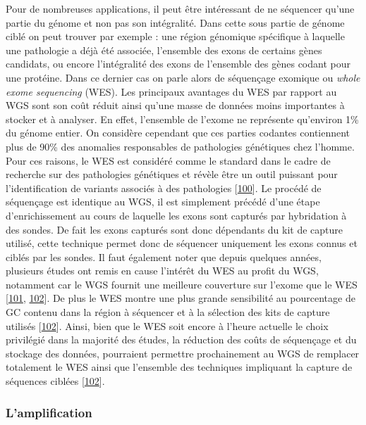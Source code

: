 \documentclass[12pt,twoside]{reedthesis}
\theoremstyle{definition}
\theoremstyle{definition}
\theoremstyle{remark}
\begin{document}
  Pour de nombreuses applications, il peut être intéressant de ne
  séquencer qu'une partie du génome et non pas son intégralité. Dans cette
  sous partie de génome ciblé on peut trouver par exemple : une région
  génomique spécifique à laquelle une pathologie a déjà été associée,
  l'ensemble des exons de certains gènes candidats, ou encore
  l'intégralité des exons de l'ensemble des gènes codant pour une
  protéine. Dans ce dernier cas on parle alors de séquençage exomique ou
  \emph{whole exome sequencing} (WES). Les principaux avantages du WES par
  rapport au WGS sont son coût réduit ainsi qu'une masse de données moins
  importantes à stocker et à analyser. En effet, l'ensemble de l'exome ne
  représente qu'environ 1\% du génome entier. On considère cependant que
  ces parties codantes contiennent plus de 90\% des anomalies responsables
  de pathologies génétiques chez l'homme. Pour ces raisons, le WES est
  considéré comme le standard dans le cadre de recherche sur des
  pathologies génétiques et révèle être un outil puissant pour
  l'identification de variants associés à des pathologies
  {[}\protect\hyperlink{ref-Ng2010}{100}{]}. Le procédé de séquençage est
  identique au WGS, il est simplement précédé d'une étape d'enrichissement
  au cours de laquelle les exons sont capturés par hybridation à des
  sondes. De fait les exons capturés sont donc dépendants du kit de
  capture utilisé, cette technique permet donc de séquencer uniquement les
  exons connus et ciblés par les sondes. Il faut également noter que
  depuis quelques années, plusieurs études ont remis en cause l'intérêt du
  WES au profit du WGS, notamment car le WGS fournit une meilleure
  couverture sur l'exome que le WES
  {[}\protect\hyperlink{ref-Lelieveld2015}{101},
  \protect\hyperlink{ref-Meienberg2016}{102}{]}. De plus le WES montre une
  plus grande sensibilité au pourcentage de GC contenu dans la région à
  séquencer et à la sélection des kits de capture utilisés
  {[}\protect\hyperlink{ref-Meienberg2016}{102}{]}. Ainsi, bien que le WES
  soit encore à l'heure actuelle le choix privilégié dans la majorité des
  études, la réduction des coûts de séquençage et du stockage des données,
  pourraient permettre prochainement au WGS de remplacer totalement le WES
  ainsi que l'ensemble des techniques impliquant la capture de séquences
  ciblées {[}\protect\hyperlink{ref-Meienberg2016}{102}{]}.
  
  \subsubsection{L'amplification}\label{lamplification}
  
\end{document}
